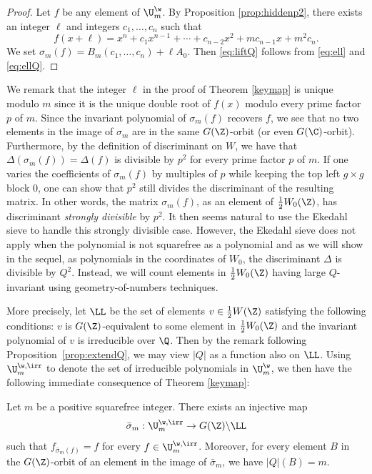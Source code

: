 \begin{proof}
Let $f$ be any element of $\U_m^\w$. By Proposition \ref{prop:hiddenp2}, there exists an integer $\ell$ and integers $c_1,\ldots,c_n$ such that
$$f(x+\ell) = x^n + c_1x^{n-1} + \cdots + c_{n-2}x^2 + mc_{n-1}x + m^2c_n.$$
We set $\sigma_m(f) = B_m(c_1,\ldots,c_n) + \ell A_0$. Then \eqref{eq:liftQ} follows from  \eqref{eq:ell} and \eqref{eq:ellQ}.
\end{proof}

We remark that the integer $\ell$ in the proof of Theorem \ref{keymap}
is unique modulo $m$ since it is the unique double root of $f(x)$
modulo every prime factor $p$ of $m$. Since the invariant polynomial
of $\sigma_m(f)$ recovers $f$, we see that no two elements in the
image of $\sigma_m$ are in the same $G(\Z)$-orbit (or even
$G(\C)$-orbit). Furthermore, by the definition of discriminant on $W$,
we have that $\Delta(\sigma_m(f))=\Delta(f)$ is divisible by $p^2$ for
every prime factor $p$ of $m$. If one varies the coefficients of
$\sigma_m(f)$ by multiples of $p$ while keeping the top left $g\times
g$ block $0$, one can show that $p^2$ still divides the discriminant
of the resulting matrix. In other words, the matrix $\sigma_m(f)$, as
an element of $\frac12 W_0(\Z)$, has discriminant \emph{strongly
  divisible} by $p^2$. It then seems natural to use the Ekedahl sieve
to handle this strongly divisible case. However, the Ekedahl sieve
does not apply when the polynomial is not squarefree as a polynomial
and as we will show in the sequel, as polynomials in the coordinates
of $W_0$, the discriminant $\Delta$ is divisible by $Q^2$. Instead, we
will count elements in $\frac12W_0(\Z)$ having large $Q$-invariant
using geometry-of-numbers techniques.

More precisely, let $\LL$ be the set of elements $v\in \frac12W(\Z)$
satisfying the following conditions: $v$ is $G(\Z)$-equivalent to some
element in $\frac12W_0(\Z)$ and the invariant polynomial of $v$ is
irreducible over $\Q$.  Then by the remark following
Proposition~\ref{prop:extendQ}, we may view $|Q|$ as a function also
on $\LL$.  Using $\U_m^{\w,\irr}$ to denote the set of irreducible
polynomials in $\U_m^\w$, we then have the following immediate
consequence of Theorem \ref{keymap}:

\begin{theorem}
\notready\label{keymaporbit}
Let $m$ be a positive squarefree integer. There exists an injective map
$$\bar{\sigma}_m:\U_m^{\w,\irr}\to G(\Z)\backslash\LL$$ such that
$f_{\bar{\sigma}_m(f)}=f$ for every $f\in \U_m^{\w,\irr}$. Moreover,
for every element $B$ in the $G(\Z)$-orbit of an element in the image
of $\bar{\sigma}_m$, we have $|Q|(B)=m$.
\end{theorem}


